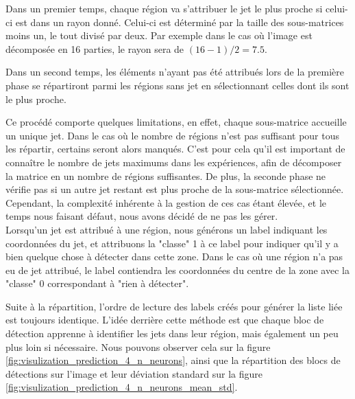 Dans un premier temps, chaque région va s'attribuer le jet le plus proche si celui-ci est dans un rayon donné. Celui-ci est déterminé par la taille des sous-matrices moins un, le tout divisé par deux. Par exemple dans le cas où l'image est décomposée en 16 parties, le rayon sera de $(16-1)/2=7.5$.

Dans un second temps, les éléments n'ayant pas été attribués lors de la première phase se répartiront parmi les régions sans jet en sélectionnant celles dont ils sont le plus proche.

Ce procédé comporte quelques limitations, en effet, chaque sous-matrice accueille un unique jet. Dans le cas où le nombre de régions n'est pas suffisant pour tous les répartir, certains seront alors manqués. C'est pour cela qu'il est important de connaître le nombre de jets maximums dans les expériences, afin de décomposer la matrice en un nombre de régions suffisantes. De plus, la seconde phase ne vérifie pas si un autre jet restant est plus proche de la sous-matrice sélectionnée. Cependant, la complexité inhérente à la gestion de ces cas étant élevée, et le temps nous faisant défaut, nous avons décidé de ne pas les gérer.\\

Lorsqu'un jet est attribué à une région, nous générons un label indiquant les coordonnées du jet, et attribuons la "classe" 1 à ce label pour indiquer qu'il y a bien quelque chose à détecter dans cette zone. Dans le cas où une région n'a pas eu de jet attribué, le label contiendra les coordonnées du centre de la zone avec la "classe" 0 correspondant à "rien à détecter".

Suite à la répartition, l'ordre de lecture des labels créés pour générer la liste liée est toujours identique. L'idée derrière cette méthode est que chaque bloc de détection apprenne à identifier les jets dans leur région, mais également un peu plus loin si nécessaire. Nous pouvons observer cela sur la figure \ref{fig:visulization_prediction_4_n_neurons}, ainsi que la répartition des blocs de détections sur l'image et leur déviation standard sur la figure \ref{fig:visulization_prediction_4_n_neurons_mean_std}.

